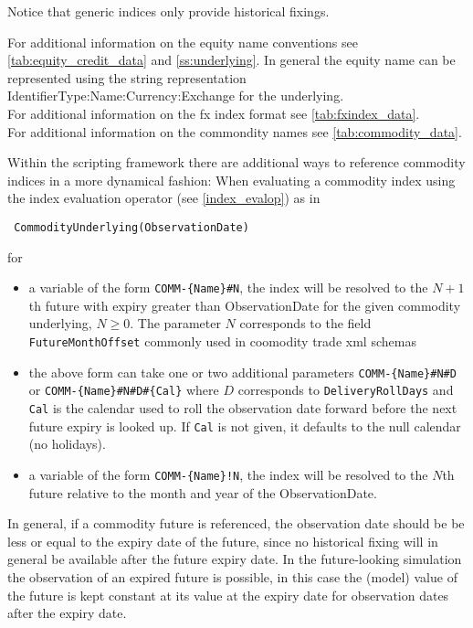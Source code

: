 Notice that generic indices only provide historical fixings.

\ifdefined\STModuleDoc
\else
For additional information on the equity name conventions see \ref{tab:equity_credit_data} and \ref{ss:underlying}. In
general the equity name can be represented using the string representation {IdentifierType}:{Name}:{Currency}:{Exchange}
for the underlying. \\
For additional information on the fx index format see \ref{tab:fxindex_data}. \\
For additional information on the commondity names see \ref{tab:commodity_data}.
\fi

Within the scripting framework there are additional ways to reference commodity indices in a more dynamical fashion:
When evaluating a commodity index using the index evaluation operator (see \ref{index_evalop}) as in

\begin{verbatim}
 CommodityUnderlying(ObservationDate)
\end{verbatim}

for

\begin{itemize}
\item a variable of the form \verb+COMM-{Name}#N+, the index will be resolved to the $N+1$th future with expiry greater than
  ObservationDate for the given commodity underlying, $N\geq0$. The parameter $N$ corresponds to the field
  \verb+FutureMonthOffset+ commonly used in coomodity trade xml schemas
\item the above form can take one or two additional parameters \verb+COMM-{Name}#N#D+ or \verb+COMM-{Name}#N#D#{Cal}+ where
  $D$ corresponds to \verb+DeliveryRollDays+ and \verb+Cal+ is the calendar used to roll the observation date forward
  before the next future expiry is looked up. If \verb+Cal+ is not given, it defaults to the null calendar (no
  holidays).
\item a variable of the form \verb+COMM-{Name}!N+, the index will be resolved to the $N$th future relative to the month and
  year of the ObservationDate.
\end{itemize}

In general, if a commodity future is referenced, the observation date should be be less or equal to the expiry date of
the future, since no historical fixing will in general be available after the future expiry date. In the future-looking
simulation the observation of an expired future is possible, in this case the (model) value of the future is kept
constant at its value at the expiry date for observation dates after the expiry date.

